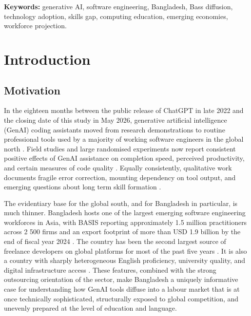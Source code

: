 \documentclass[11pt,a4paper]{report}
\begin{document}
\vspace{0.5cm}
\noindent\textbf{Keywords:} generative AI, software engineering, Bangladesh,
Bass diffusion, technology adoption, skills gap, computing education,
emerging economies, workforce projection.

\tableofcontents
\listoffigures
\listoftables

\chapter{Introduction}

\section{Motivation}

In the eighteen months between the public release of ChatGPT in late 2022
and the closing date of this study in May 2026, generative artificial
intelligence (GenAI) coding assistants moved from research demonstrations
to routine professional tools used by a majority of working software
engineers in the global north \citep{StackOverflow2025,GitHubOctoverse2024}.
Field studies and large randomised experiments now report consistent
positive effects of GenAI assistance on completion speed, perceived
productivity, and certain measures of code quality
\citep{PengKalliamvakouEtAl2023,ZieglerEtAl2024,NoyZhang2023,CuiDemirerEtAl2025,BrynjolfssonLiRaymond2025}.
Equally consistently, qualitative work documents fragile error correction,
mounting dependency on tool output, and emerging questions about
long term skill formation
\citep{Vaithilingam2022,BarkeJamesPolikarpova2023,LiangYangMyers2024,MozannarEtAl2024,KalliamvakouEtAl2024}.

The evidentiary base for the global south, and for Bangladesh in
particular, is much thinner. Bangladesh hosts one of the largest emerging
software engineering workforces in Asia, with BASIS reporting approximately
1.5 million practitioners across 2 500 firms and an export footprint of
more than USD 1.9 billion by the end of fiscal year 2024
\citep{BASIS2024,BASIS2025}. The country has been the second largest
source of freelance developers on global platforms for most of the past
five years \citep{KaramSiddiqueAlam2025}. It is also a country with
sharply heterogeneous English proficiency, university quality, and digital
infrastructure access \citep{EFEPI2024,WorldBank2024DigitalBD,BBS2024LFS}.
These features, combined with the strong outsourcing orientation of the
sector, make Bangladesh a uniquely informative case for understanding how
GenAI tools diffuse into a labour market that is at once technically
sophisticated, structurally exposed to global competition, and unevenly
prepared at the level of education and language.
\end{document}
